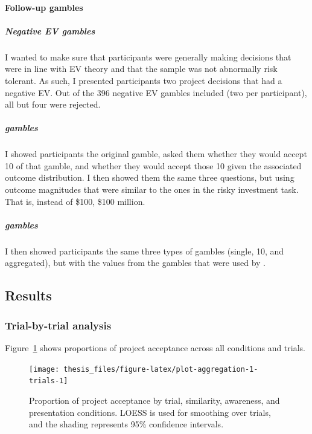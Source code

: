 \documentclass[a4paper, nobind, dvipsnames]{templates/ociamthesis}
\theoremstyle{definition}
\theoremstyle{definition}
\theoremstyle{definition}
\theoremstyle{definition}
\theoremstyle{remark}
\begin{document}
\hypertarget{follow-up-materials-aggregation-1-appendix}{%
\paragraph{Follow-up gambles}\label{follow-up-materials-aggregation-1-appendix}}

\subparagraph{Negative EV gambles}

I wanted to make sure that participants were generally making decisions that
were in line with EV theory and that the sample was not abnormally risk
tolerant. As such, I presented participants two project decisions that had a
negative EV. Out of the 396 negative EV
gambles included (two per participant), all but
four were rejected.

\subparagraph{\texorpdfstring{\textcite{samuelson1963} gambles}{Samuelson (1963) gambles}}

I showed participants the original \textcite{samuelson1963} gamble, asked them whether
they would accept 10 of that gamble, and whether they would accept those 10
given the associated outcome distribution. I then showed them the same three
questions, but using outcome magnitudes that were similar to the ones in the
risky investment task. That is, instead of \$100, \$100 million.

\subparagraph{\texorpdfstring{\textcite{redelmeier1992} gambles}{Redelmeier \& Tversky (1992) gambles}}

I then showed participants the same three types of gambles (single, 10, and
aggregated), but with the values from the gambles that were used by
\textcite{redelmeier1992}.

\hypertarget{results-aggregation-1-appendix}{%
\subsection{Results}\label{results-aggregation-1-appendix}}

\hypertarget{trial-by-trial-aggregation-1}{%
\subsubsection{Trial-by-trial analysis}\label{trial-by-trial-aggregation-1}}

Figure~\ref{fig:plot-aggregation-1-trials} shows proportions of project
acceptance across all conditions and trials.



\begin{figure}
\texttt{[image: thesis\_files/figure-latex/plot-aggregation-1-trials-1]} \caption{Proportion of project acceptance by trial, similarity, awareness, and presentation conditions. LOESS is used for smoothing over trials, and the shading represents 95\% confidence intervals.}\label{fig:plot-aggregation-1-trials}
\end{figure}
\end{document}
